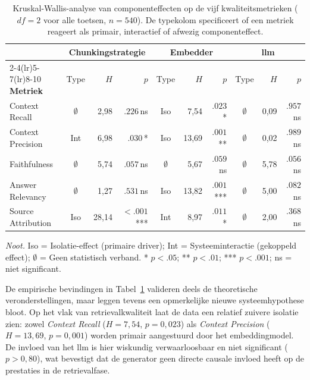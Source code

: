 \begin{table}[!htb]
\centering
\small
\begin{tabularx}{\textwidth}{@{}X crr crr crr@{}}
\toprule
& \multicolumn{3}{c}{\textbf{Chunkingstrategie}}
& \multicolumn{3}{c}{\textbf{Embedder}}
& \multicolumn{3}{c}{\textbf{\gls{llm}}} \\
\cmidrule(lr){2-4}\cmidrule(lr){5-7}\cmidrule(lr){8-10}
\textbf{Metriek} & Type & $H$ & $p$ & Type & $H$ & $p$ & Type & $H$ & $p$ \\
\midrule
Context Recall     & $\emptyset$ &   2,98 & $.226$\,ns   & Iso         &  7,54 & $.023$\,*    & $\emptyset$ &  0,09 & $.957$\,ns  \\
Context Precision  & Int         &   6,98 & $.030$\,*    & Iso         & 13,69 & $.001$\,**   & $\emptyset$ &  0,02 & $.989$\,ns  \\
Faithfulness       & $\emptyset$ &   5,74 & $.057$\,ns   & $\emptyset$ &  5,67 & $.059$\,ns   & $\emptyset$ &  5,78 & $.056$\,ns  \\
Answer Relevancy   & $\emptyset$ &   1,27 & $.531$\,ns   & Iso         & 13,82 & $.001$\,***  & $\emptyset$ &  5,00 & $.082$\,ns  \\
Source Attribution & Iso         &  28,14 & $<.001$\,*** & Int         &  8,97 & $.011$\,*    & $\emptyset$ &  2,00 & $.368$\,ns  \\
\bottomrule
\end{tabularx}
\textit{Noot.} Iso = Isolatie-effect (primaire driver); Int = Systeeminteractie (gekoppeld effect); $\emptyset$ = Geen statistisch verband. * $p < .05$; ** $p < .01$; *** $p < .001$; ns = niet significant.
\caption[Kruskal-Wallis cross-component matrix ($n=540$)]{Kruskal-Wallis-analyse van componenteffecten op de vijf kwaliteitsmetrieken ($df = 2$ voor alle toetsen, $n = 540$). De typekolom specificeert of een metriek reageert als primair, interactief of afwezig componenteffect.}
\label{tab:kw_cross_component}
\end{table}

De empirische bevindingen in Tabel~\ref{tab:kw_cross_component} valideren deels de theoretische veronderstellingen, maar leggen tevens een opmerkelijke nieuwe systeemhypothese bloot. Op het vlak van retrievalkwaliteit laat de data een relatief zuivere isolatie zien: zowel \textit{Context Recall} ($H = 7{,}54$, $p = 0{,}023$) als \textit{Context Precision} ($H = 13{,}69$, $p = 0{,}001$) worden primair aangestuurd door het embeddingmodel. De invloed van het \gls{llm} is hier wiskundig verwaarloosbaar en niet significant ($p > 0{,}80$), wat bevestigt dat de generator geen directe causale invloed heeft op de prestaties in de retrievalfase.

